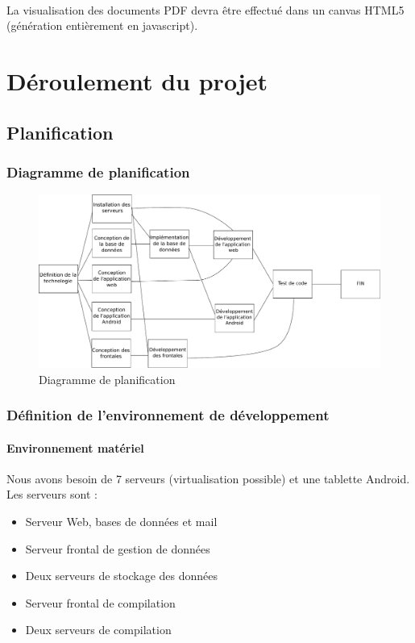 \documentclass[a4paper,12pt]{article}
\begin{document}
\paragraph*{}
La visualisation des documents PDF devra être effectué dans un canvas HTML5 (génération entièrement en javascript).

\section{Déroulement du projet}

\subsection{Planification}
\newpage
\subsubsection{Diagramme de planification}
\begin{figure}[!ht]
\begin {center}
\includegraphics[width=1\textwidth,angle=90]{./Diagramme/mpm.pdf}
\end{center}
\label{MPM}
\caption{Diagramme de planification}
\end{figure}
\newpage

\subsubsection{Définition de l'environnement de développement}

\paragraph*{Environnement matériel\\} 
Nous avons besoin de 7 serveurs (virtualisation possible) et une tablette Android. Les serveurs sont :
\begin{itemize}
 \item Serveur Web, bases de données et mail
 \item Serveur frontal de gestion de données
 \item Deux serveurs de stockage des données
 \item Serveur frontal de compilation
 \item Deux serveurs de compilation
\end{itemize}
\end{document}
